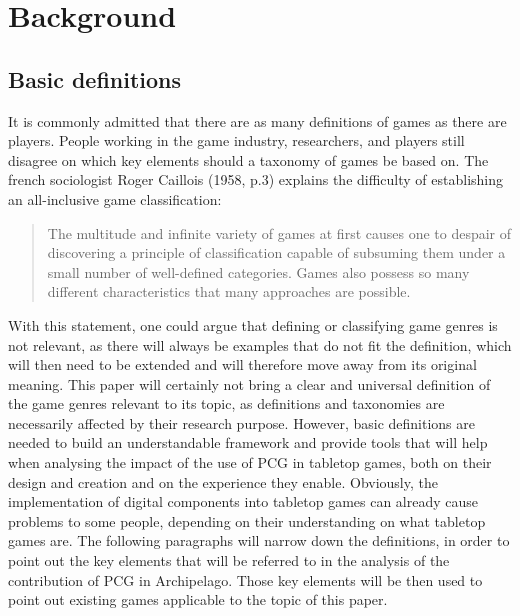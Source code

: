 \section{Background}
\subsection{Basic definitions}
It is commonly admitted that there are as many definitions of games as there are players. People working in the game industry, researchers, and players still disagree on which key elements should a taxonomy of games be based on. The french sociologist Roger Caillois (1958, p.3) explains the difficulty of establishing an all-inclusive game classification:
\begin{quotation}
The multitude and infinite variety of games at first causes one to despair of discovering a principle of classification capable of subsuming them under a small number of well-defined categories. Games also possess so many different characteristics that many approaches are possible.
\end{quotation} 
With this statement, one could argue that defining or classifying game genres is not relevant, as there will always be examples that do not fit the definition, which will then need to be extended and will therefore move away from its original meaning. This paper will certainly not bring a clear and universal definition of the game genres relevant to its topic, as definitions and taxonomies are necessarily affected by their research purpose. However, basic definitions are needed to build an understandable framework and provide tools that will help when analysing the impact of the use of PCG in tabletop games, both on their design and creation and on the experience they enable.
Obviously, the implementation of digital components into tabletop games can already cause problems to some people, depending on their understanding on what tabletop games are. The following paragraphs will narrow down the definitions, in order to point out the key elements that will be referred to in the analysis of the contribution of PCG in Archipelago. Those key elements will be then used to point out existing games applicable to the topic of this paper.
